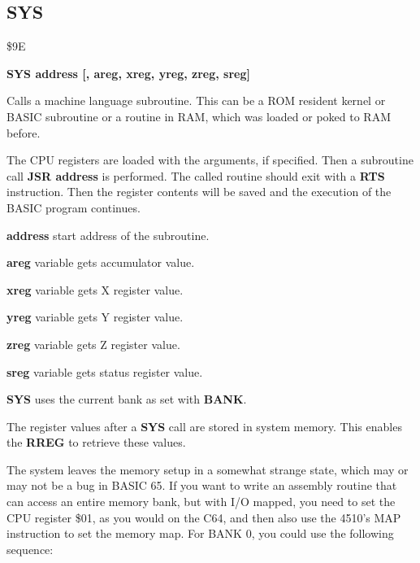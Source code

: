 
\newpage
\subsection{SYS}
\begin{description}[leftmargin=2cm,style=nextline]
\item [Token:] \$9E
\item [Format:] {\bf SYS address [, areg, xreg, yreg, zreg, sreg]}
\item [Usage:]  Calls a machine language subroutine.
                This can be a ROM resident kernel or BASIC subroutine
                or a routine in RAM, which was loaded or poked
                to RAM before.

               The CPU registers are loaded with the arguments,
               if specified. Then a subroutine call {\bf JSR address}
               is performed. The called routine should exit with
               a {\bf RTS} instruction. Then the register contents
               will be saved and the execution of the BASIC program
               continues.

               {\bf address} start address of the subroutine.

               {\bf areg} variable gets accumulator value.

               {\bf xreg} variable gets X register value.

               {\bf yreg} variable gets Y register value.

               {\bf zreg} variable gets Z register value.

               {\bf sreg} variable gets status register value.

                 {\bf SYS} uses the current bank
                 as set with {\bf BANK}.

\item [Remarks:] The register values after a {\bf SYS} call are stored
                 in system memory. This enables the
                 {\bf RREG} to retrieve these values.

\item [Remarks:] The system leaves the memory setup in a somewhat
  strange state, which may or may not be a bug in BASIC 65.
  If you want to write an assembly routine that can
  access an entire memory bank, but with I/O mapped, you need to set
  the CPU register \$01, as you would on the C64, and then also use the 4510's
  MAP instruction to set the memory map.  For BANK 0, you could use
  the following sequence:


\end{description}
